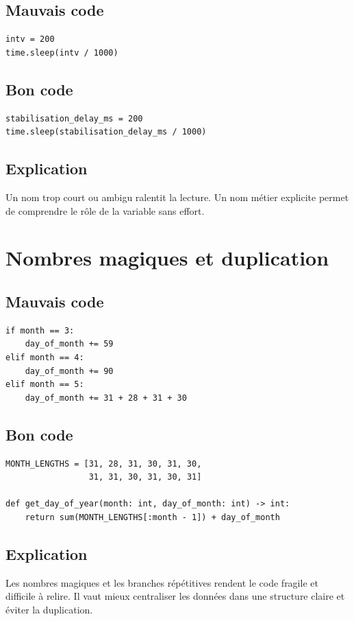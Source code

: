 \documentclass[a4paper,11pt]{report}
\begin{document}
\section{Mauvais code}
\begin{lstlisting}
intv = 200
time.sleep(intv / 1000)
\end{lstlisting}

\section{Bon code}
\begin{lstlisting}
stabilisation_delay_ms = 200
time.sleep(stabilisation_delay_ms / 1000)
\end{lstlisting}

\section{Explication}
Un nom trop court ou ambigu ralentit la lecture.
Un nom métier explicite permet de comprendre le rôle de la variable sans effort.

\chapter{Nombres magiques et duplication}

\section{Mauvais code}
\begin{lstlisting}
if month == 3:
    day_of_month += 59
elif month == 4:
    day_of_month += 90
elif month == 5:
    day_of_month += 31 + 28 + 31 + 30
\end{lstlisting}

\section{Bon code}
\begin{lstlisting}
MONTH_LENGTHS = [31, 28, 31, 30, 31, 30,
                 31, 31, 30, 31, 30, 31]

def get_day_of_year(month: int, day_of_month: int) -> int:
    return sum(MONTH_LENGTHS[:month - 1]) + day_of_month
\end{lstlisting}

\section{Explication}
Les nombres magiques et les branches répétitives rendent le code fragile et difficile à relire.
Il vaut mieux centraliser les données dans une structure claire et éviter la duplication.
\end{document}
